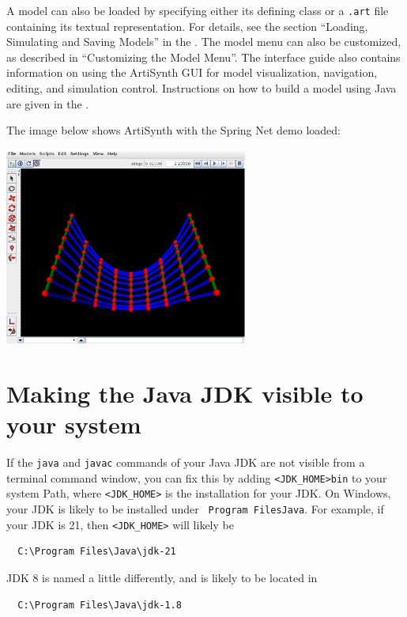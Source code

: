 A model can also be loaded by specifying either its defining class or
a {\tt .art} file containing its textual representation.  For details,
see the section ``Loading, Simulating and Saving Models'' in
the .  The
model menu can also be customized, as described in ``Customizing the
Model Menu''. The interface guide also contains information on using
the ArtiSynth GUI for model visualization, navigation, editing, and
simulation control. Instructions on how to build a model using Java
are given in the .

The image below shows ArtiSynth with the {\sf Spring Net} demo loaded:

\begin{center}
   \includegraphics[width=0.60\textwidth]{images/SpringNetDemo}
\end{center}

\section{Making the Java JDK visible to your system}
\label{MakingJDKVisible:sec}

If the {\tt java} and {\tt javac} commands of your Java JDK are not
visible from a terminal command window, 
\ifWindows
you can fix this by adding
{\tt <JDK\_HOME>\BKS bin} to your system Path, where
{\tt <JDK\_HOME>} is the installation \directory{} for your JDK. 
On Windows, your JDK is likely to be installed under {\tt
Program Files\SEP Java}. For example, if your JDK is 21, 
then {\tt <JDK\_HOME>} will likely be
\begin{verbatim}
  C:\Program Files\Java\jdk-21
\end{verbatim}
JDK 8 is named a little differently, and is likely to be located in
\begin{verbatim}
  C:\Program Files\Java\jdk-1.8
\end{verbatim}

